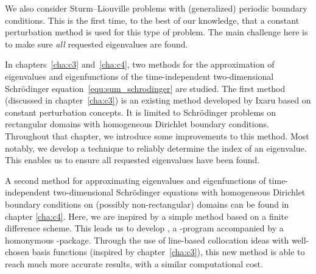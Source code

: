 We also consider Sturm--Liouville problems with (generalized) periodic boundary conditions. This is the first time, to the best of our knowledge, that a constant perturbation method is used for this type of problem. The main challenge here is to make sure \emph{all} requested eigenvalues are found.

In chapters~\ref{cha:c3} and~\ref{cha:c4}, two methods for the approximation of eigenvalues and eigenfunctions of the time-independent two-dimensional Schrödinger equation~\eqref{equ:sum_schrodinger}  are studied. The first method (discussed in chapter~\ref{cha:c3}) is an existing method developed by Ixaru based on constant perturbation concepts. It is limited to Schrödinger problems on rectangular domains with homogeneous Dirichlet boundary conditions. Throughout that chapter, we introduce some improvements to this method. Most notably, we develop a technique to reliably determine the index of an eigenvalue. This enables us to ensure all requested eigenvalues have been found.

A second method for approximating eigenvalues and eigenfunctions of time-independent two-dimensional Schrödinger equations with homogeneous Dirichlet boundary conditions on (possibly non-rectangular) domains can be found in chapter \ref{cha:c4}. Here, we are inspired by a simple method based on a finite difference scheme. This leads us to develop \strands{}, a \cpp{}-program accompanied by a homonymous \lpython{}-package. Through the use of line-based collocation ideas with well-chosen basis functions (inspired by chapter~\ref{cha:c3}), this new method is able to reach much more accurate results, with a similar computational cost.

